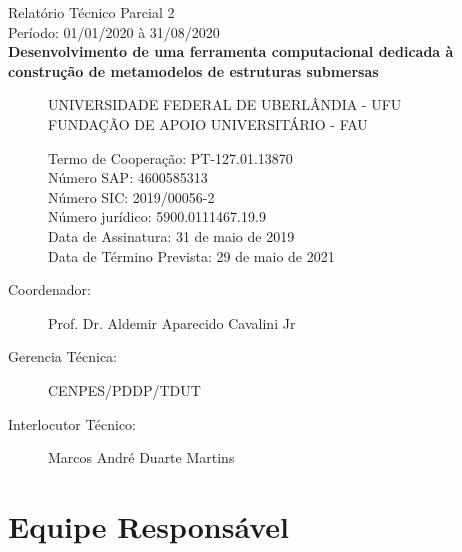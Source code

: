 \documentclass[12pt,fleqn,a4paper]{report}
\begin{document}
	\begin{large}
		\begin{center}
			Relatório Técnico Parcial 2\\
			\vspace*{10 pt}
			Período: 01/01/2020 à 31/08/2020\\
			\vspace*{25 pt}
			{\bf Desenvolvimento de uma ferramenta computacional dedicada à construção de metamodelos de estruturas submersas}
		\end{center}
	\end{large}
	
	\vspace*{10 pt}
	\begin{normalsize}
		\begin{description}
			\item[] 
	
			\hspace{0.7cm} UNIVERSIDADE FEDERAL DE UBERLÂNDIA - UFU\\
			FUNDA\c C\~AO DE APOIO UNIVERSITÁRIO - FAU
			\begin{flushleft}
				Termo de Cooperação: PT-127.01.13870 \\
				Número SAP: 4600585313 \\
				Número SIC: 2019/00056-2 \\
				Número jurídico: 5900.0111467.19.9\\
				Data de Assinatura: 31 de maio de 2019\\
				Data de Término Prevista: 29 de maio de 2021
			\end{flushleft}
	
			\vspace{10pt}
			\item[Coordenador:] Prof. Dr. Aldemir Aparecido Cavalini Jr  \\
			\item[Gerencia Técnica:] CENPES/PDDP/TDUT
			\item[Interlocutor Técnico:] Marcos André Duarte Martins
	
		\end{description}
	\end{normalsize}
	
	\newpage
	
	\section*{Equipe Responsável}
\end{document}
